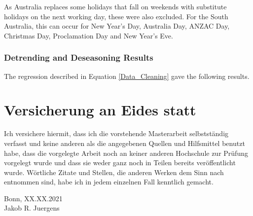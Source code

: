 \documentclass[12pt, a4paper]{article}
\theoremstyle{MAstyle} \newtheorem{assumption}{Assumption}[section]
\theoremstyle{MAstyle} \newtheorem{definition}{Definition}[section]
\theoremstyle{MAstyle} \newtheorem{theorem}{Theorem}[section]
\begin{document}
			As Australia replaces some holidays that fall on weekends with substitute holidays on the next working day, these were also excluded. For the South Australia, this can occur for New Year's Day, Australia Day, ANZAC Day, Christmas Day, Proclamation Day and New Year's Eve.
		
			\subsubsection{Detrending and Deseasoning Results}
			The regression described in Equation \ref{Data_Cleaning} gave the following results.
			
			
	\newpage
	\thispagestyle{empty}
	\section*{Versicherung an Eides statt}	
	
		\vspace{3cm}
		
		Ich versichere hiermit, dass ich die vorstehende Masterarbeit
		selbstständig verfasst und keine anderen als die angegebenen Quellen
		und Hilfsmittel benutzt habe, dass die vorgelegte Arbeit noch an keiner
		anderen Hochschule zur Prüfung vorgelegt wurde und dass sie weder
		ganz noch in Teilen bereits veröffentlicht wurde. Wörtliche Zitate und
		Stellen, die anderen Werken dem Sinn nach entnommen sind, habe ich
		in jedem einzelnen Fall kenntlich gemacht.
		
		\vspace{2cm}
		Bonn, XX.XX.2021 \hrulefill \\
		\hspace*{0mm}Jakob R. Juergens
		
		\vspace{\fill}
\end{document}
